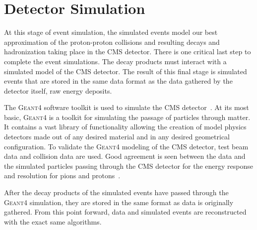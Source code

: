 \section{Detector Simulation}
At this stage of event simulation, the simulated events model our best approximation
of the proton-proton collisions and resulting decays and hadronization taking place
in the CMS detector. There is one critical last step to complete the event
simulations. The decay products must interact with a simulated
model of the CMS detector. The result of this final stage is simulated events that
are stored in the same data format as the data gathered by the detector itself,
raw energy deposits.

The \textsc{Geant4} software toolkit is used to simulate the CMS 
detector~\cite{Agostinelli:2002hh}. At its most basic, \textsc{Geant4} is a 
toolkit for simulating the passage of particles through matter. It contains a 
vast library of functionality allowing the creation of model physics detectors
made out of any desired material and in any desired geometrical configuration.
To validate the \textsc{Geant4} modeling of the CMS detector, test beam data and
collision data are used. Good agreement is seen between the data and the
simulated particles passing through the CMS detector for the energy response
and resolution for pions and protons~\cite{geant4_cms_2017}.

After the decay products of the simulated events have passed through the \textsc{Geant4}
simulation, they are stored in the same format as data is originally gathered. From
this point forward, data and simulated events are reconstructed with the exact same 
algorithms.




